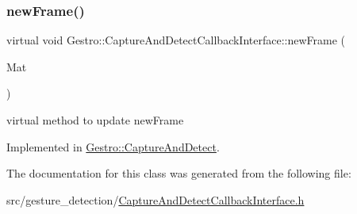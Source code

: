 \subsubsection{\texorpdfstring{new\+Frame()}{newFrame()}}
{\footnotesize\ttfamily virtual void Gestro\+::\+Capture\+And\+Detect\+Callback\+Interface\+::new\+Frame (\begin{DoxyParamCaption}\item[{Mat}]{ }\end{DoxyParamCaption})\hspace{0.3cm}{\ttfamily [pure virtual]}}



virtual method to update new\+Frame 



Implemented in \hyperlink{classGestro_1_1CaptureAndDetect_a7f18d1c58b2ae4241766b36aa27385e9}{Gestro\+::\+Capture\+And\+Detect}.



The documentation for this class was generated from the following file\+:\begin{DoxyCompactItemize}
\item 
src/gesture\+\_\+detection/\hyperlink{CaptureAndDetectCallbackInterface_8h}{Capture\+And\+Detect\+Callback\+Interface.\+h}\end{DoxyCompactItemize}
